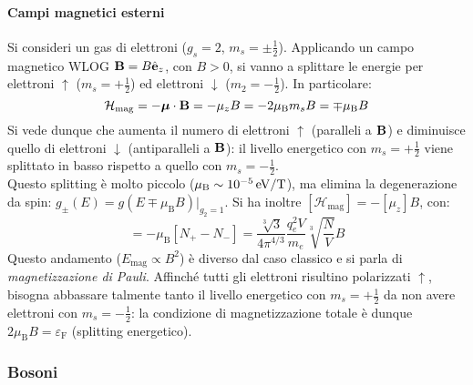 \paragraph{Campi magnetici esterni}

Si consideri un gas di elettroni ($ g_s = 2 $, $ m_s = \pm \frac{1}{2} $). Applicando un campo magnetico WLOG $ \mathbf{B} = B \hat{\mathbf{e}}_z $, con $ B > 0 $, si vanno a splittare le energie per elettroni $ \uparrow $ ($ m_s = + \frac{1}{2} $) ed elettroni $ \downarrow $ ($ m_2 = - \frac{1}{2} $). In particolare:
\begin{equation*}
	\mathcal{H}_\text{mag} = - \boldsymbol{\mu} \cdot \mathbf{B} = - \mu_z B = - 2 \mu_\text{B} m_s B = \mp \mu_\text{B} B
\end{equation*}
Si vede dunque che aumenta il numero di elettroni $ \uparrow $ (paralleli a $ \mathbf{B} $) e diminuisce quello di elettroni $ \downarrow $ (antiparalleli a $ \mathbf{B} $): il livello energetico con $ m_s = + \frac{1}{2} $ viene splittato in basso rispetto a quello con $ m_s = - \frac{1}{2} $. \\
Questo splitting è molto piccolo ($ \mu_\text{B} \sim 10^{-5} \,\mathrm{eV}/\text{T} $), ma elimina la degenerazione da spin: $ g_\pm(E) = g(E \mp \mu_\text{B} B)\vert_{g_2 = 1} $. Si ha inoltre $ [\mathcal{H}_\text{mag}] = - [\mu_z] B $, con:
\begin{equation}
	[\mu_z] = -\mu_\text{B} [N_+ - N_-] = \frac{\sqrt[3]{3}}{4\pi^{4/3}} \frac{q_e^2 V}{m_e} \sqrt[3]{\frac{N}{V}} B
\end{equation}
Questo andamento ($ E_\text{mag} \propto B^2 $) è diverso dal caso classico e si parla di \textit{magnetizzazione di Pauli}. Affinché tutti gli elettroni risultino polarizzati $ \uparrow $, bisogna abbassare talmente tanto il livello energetico con $ m_s = + \frac{1}{2} $ da non avere elettroni con $ m_s = - \frac{1}{2} $: la condizione di magnetizzazione totale è dunque $ 2\mu_\text{B} B = \varepsilon_\text{F} $ (splitting energetico).

\subsubsection{Bosoni}

